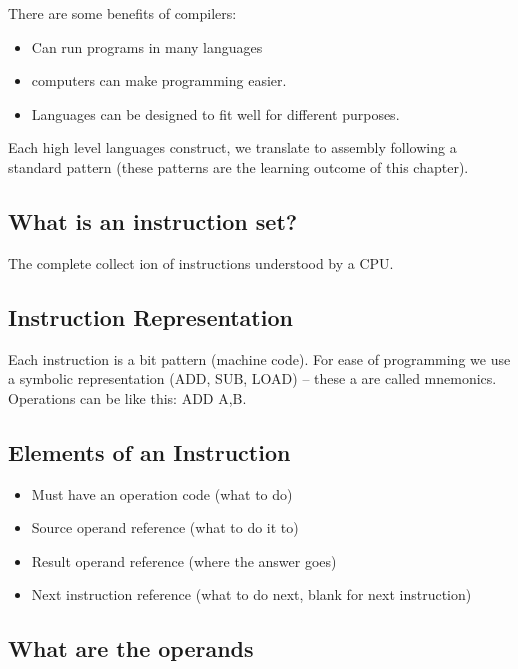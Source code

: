 There are some benefits of compilers:
\begin{itemize}
    \item Can run programs in many languages
    \item computers can make programming easier.
    \item Languages can be designed to fit well for different purposes.
\end{itemize}

Each high level languages construct, we translate to assembly following a standard pattern (these patterns are the learning outcome of this chapter).

\subsection{What is an instruction set?}\label{sub:what_is_an_instruction_set_}

The complete collect ion of instructions understood by a CPU.

\subsection{Instruction Representation}\label{sub:instruction_representation}

Each instruction is a bit pattern (machine code).
For ease of programming we use a symbolic representation (ADD, SUB, LOAD) -- these a are called mnemonics.
Operations can be like this: ADD A,B.

\subsection{Elements of an Instruction}\label{sub:elements_of_an_instruction}

\begin{itemize}
    \item Must have an operation code (what to do)
    \item Source operand reference (what to do it to)
    \item Result operand reference (where the answer goes)
    \item Next instruction reference (what to do next, blank for next instruction)
\end{itemize}

\subsection{What are the operands}\label{sub:what_are_the_operands}

